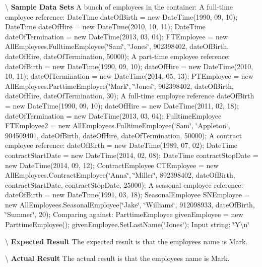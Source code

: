 \textbackslash{} {\bfseries  Sample Data Sets} A bunch of employees in the container\+: A full-\/time employee reference\+: Date\+Time date\+Of\+Birth = new Date\+Time(1990, 09, 10); Date\+Time date\+Of\+Hire = new Date\+Time(2010, 10, 11); Date\+Time date\+Of\+Termination = new Date\+Time(2013, 03, 04); F\+T\+Employee = new All\+Employees.\+Fulltime\+Employee(\char`\"{}\+Sam\char`\"{}, \char`\"{}\+Jones\char`\"{}, 902398402, date\+Of\+Birth, date\+Of\+Hire, date\+Of\+Termination, 50000); A part-\/time employee reference\+: date\+Of\+Birth = new Date\+Time(1990, 09, 10); date\+Of\+Hire = new Date\+Time(2010, 10, 11); date\+Of\+Termination = new Date\+Time(2014, 05, 13); P\+T\+Employee = new All\+Employees.\+Parttime\+Employee(\char`\"{}\+Mark\char`\"{}, \char`\"{}\+Jones\char`\"{}, 902398402, date\+Of\+Birth, date\+Of\+Hire, date\+Of\+Termination, 30); A full-\/time employee reference date\+Of\+Birth = new Date\+Time(1990, 09, 10); date\+Of\+Hire = new Date\+Time(2011, 02, 18); date\+Of\+Termination = new Date\+Time(2013, 03, 04); Fulltime\+Employee F\+T\+Employee2 = new All\+Employees.\+Fulltime\+Employee(\char`\"{}\+Sam\char`\"{}, \char`\"{}\+Appleton\char`\"{}, 904509401, date\+Of\+Birth, date\+Of\+Hire, date\+Of\+Termination, 50000); A contract employee reference\+: date\+Of\+Birth = new Date\+Time(1989, 07, 02); Date\+Time contract\+Start\+Date = new Date\+Time(2014, 02, 08); Date\+Time contract\+Stop\+Date = new Date\+Time(2014, 09, 12); Contract\+Employee C\+T\+Employee = new All\+Employees.\+Contract\+Employee(\char`\"{}\+Anna\char`\"{}, \char`\"{}\+Miller\char`\"{}, 892398402, date\+Of\+Birth, contract\+Start\+Date, contract\+Stop\+Date, 25000); A seasonal employee reference\+: date\+Of\+Birth = new Date\+Time(1991, 03, 18); Seasonal\+Employee S\+N\+Employee = new All\+Employees.\+Seasonal\+Employee(\char`\"{}\+Jake\char`\"{}, \char`\"{}\+Williams\char`\"{}, 912098933, date\+Of\+Birth, \char`\"{}\+Summer\char`\"{}, 20); Comparing against\+: Parttime\+Employee given\+Employee = new Parttime\+Employee(); given\+Employee.\+Set\+Last\+Name(\char`\"{}\+Jones\char`\"{}); Input string\+: \char`\"{}\+Y\textbackslash{}n\char`\"{}

\textbackslash{} {\bfseries  Expected Result} The expected result is that the employee\textquotesingle{}s name is Mark.

\textbackslash{} {\bfseries  Actual Result} The actual result is that the employee\textquotesingle{}s name is Mark. \hypertarget{class_the_company_1_1_tests_1_1_select_employee_tests_a2c1e3fb8fa72796ca0080da5affcfda5}{}
